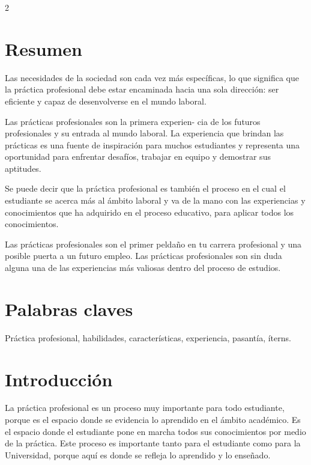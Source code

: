 \documentclass[12pt,spanish,Letterpaper,openany]{book}
\begin{document}
\begin {multicols}{2}

\hypertarget{resumen-9}{%
\section{Resumen}\label{resumen-9}}

Las necesidades de la sociedad son cada vez más específicas, lo que significa que la práctica profesional debe estar encaminada hacia una sola dirección: ser eficiente y capaz de desenvolverse en el mundo laboral.

Las prácticas profesionales son la primera experien-
cia de los futuros profesionales y su entrada al mundo laboral. La experiencia que brindan las prácticas es una fuente de inspiración para muchos estudiantes y representa una oportunidad para enfrentar desafíos, trabajar en equipo y demostrar sus aptitudes.

Se puede decir que la práctica profesional es también el proceso en el cual el estudiante se acerca más al ámbito laboral y va de la mano con las experiencias y conocimientos que ha adquirido en el proceso educativo, para aplicar todos los conocimientos.

Las prácticas profesionales son el primer peldaño en tu carrera profesional y una posible puerta a un futuro empleo. Las prácticas profesionales son sin duda alguna una de las experiencias más valiosas dentro del proceso de estudios.

\hypertarget{palabras-claves-9}{%
\section{Palabras claves}\label{palabras-claves-9}}

Práctica profesional, habilidades, características, experiencia, pasantía, íterns.

\hypertarget{introducciuxf3n-9}{%
\section{Introducción}\label{introducciuxf3n-9}}

La práctica profesional es un proceso muy importante para todo estudiante, porque es el espacio donde se evidencia lo aprendido en el ámbito académico. Es el espacio donde el estudiante pone en marcha todos sus conocimientos por medio de la práctica. Este proceso es importante tanto para el estudiante como para la Universidad, porque aquí es donde se refleja lo aprendido y lo enseñado.


\end{multicols}
\end{document}
